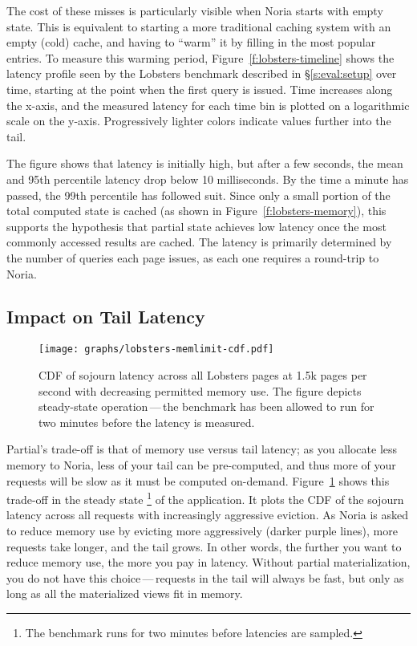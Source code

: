The cost of these misses is particularly visible when Noria starts with empty
state. This is equivalent to starting a more traditional caching system with an
empty (cold) cache, and having to ``warm'' it by filling in the most popular
entries. To measure this warming period, Figure~\ref{f:lobsters-timeline} shows
the latency profile seen by the Lobsters benchmark described in
\S\ref{s:eval:setup} over time, starting at the point when the first query is
issued. Time increases along the x-axis, and the measured latency for each time
bin is plotted on a logarithmic scale on the y-axis. Progressively lighter
colors indicate values further into the tail.

The figure shows that latency is initially high, but after a few seconds, the
mean and 95th percentile latency drop below 10 milliseconds. By the time a
minute has passed, the 99th percentile has followed suit. Since only a small
portion of the total computed state is cached (as shown in
Figure~\ref{f:lobsters-memory}), this supports the hypothesis that partial state
achieves low latency once the most commonly accessed results are cached.
The latency is primarily determined by the number of queries each page issues,
as each one requires a round-trip to Noria.

\subsection{Impact on Tail Latency}

\begin{figure}[h]
  \centering
  \texttt{[image: graphs/lobsters-memlimit-cdf.pdf]}
  \caption{CDF of sojourn latency across all Lobsters pages at 1.5k pages per
  second with decreasing permitted memory use. The figure depicts steady-state
  operation\,---\,the benchmark has been allowed to run for two minutes before
  the latency is measured.}
  \label{f:lobsters-mem-latency}
\end{figure}

Partial's trade-off is that of memory use versus tail latency; as you allocate
less memory to Noria, less of your tail can be pre-computed, and thus more of
your requests will be slow as it must be computed on-demand.
Figure~\ref{f:lobsters-mem-latency} shows this trade-off in the steady state%
\footnote{The benchmark runs for two minutes before latencies are sampled.}
of the application. It plots the CDF of the sojourn latency across all requests
with increasingly aggressive eviction. As Noria is asked to
reduce memory use by evicting more aggressively (darker purple lines), more
requests take longer, and the tail grows. In other words, the further you want
to reduce memory use, the more you pay in latency. Without partial
materialization, you do not have this choice\,---\,requests in the tail will
always be fast, but only as long as all the materialized views fit in memory.

